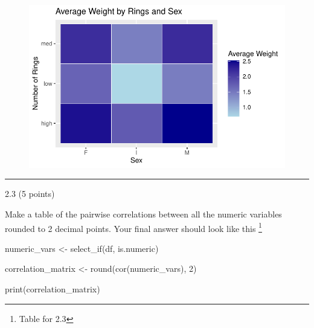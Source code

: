 \documentclass[
  letterpaper,
  DIV=11,
  numbers=noendperiod]{scrartcl}
\newenvironment{Shaded}{\begin{snugshade}}{\end{snugshade}}
\newcommand{\DecValTok}[1]{\textcolor[rgb]{0.68,0.00,0.00}{#1}}
\newcommand{\FunctionTok}[1]{\textcolor[rgb]{0.28,0.35,0.67}{#1}}
\newcommand{\NormalTok}[1]{\textcolor[rgb]{0.00,0.23,0.31}{#1}}
\newcommand{\OtherTok}[1]{\textcolor[rgb]{0.00,0.23,0.31}{#1}}
\begin{document}
\begin{figure}[H]

{\centering \includegraphics{hw2_files/figure-pdf/unnamed-chunk-10-1.pdf}

}

\end{figure}

\begin{center}\rule{0.5\linewidth}{0.5pt}\end{center}

2.3 (5 points)

Make a table of the pairwise correlations between all the numeric
variables rounded to 2 decimal points. Your final answer should look
like this \footnote{Table for 2.3}

\begin{Shaded}
\begin{Highlighting}[]
\NormalTok{numeric\_vars }\OtherTok{\textless{}{-}} \FunctionTok{select\_if}\NormalTok{(df, is.numeric)}

\NormalTok{correlation\_matrix }\OtherTok{\textless{}{-}} \FunctionTok{round}\NormalTok{(}\FunctionTok{cor}\NormalTok{(numeric\_vars), }\DecValTok{2}\NormalTok{)}

\FunctionTok{print}\NormalTok{(correlation\_matrix)}
\end{Highlighting}
\end{Shaded}
\end{document}
